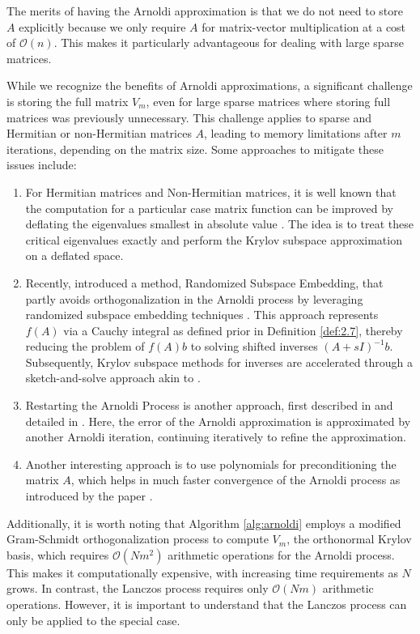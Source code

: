 The merits of having the Arnoldi approximation is that we do not need to store $A$ explicitly because we only require $A$ for matrix-vector multiplication at a cost of $\mathcal{O}(n)$. This makes it particularly advantageous for dealing with large sparse matrices.

While we recognize the benefits of Arnoldi approximations, a significant challenge is storing the full matrix $V_m$, even for large sparse matrices where storing full matrices was previously unnecessary. This challenge applies to sparse and Hermitian or non-Hermitian matrices $A$, leading to memory limitations after $m$ iterations, depending on the matrix size. Some approaches to mitigate these issues include:

\begin{enumerate}
    \item For Hermitian matrices and Non-Hermitian matrices, it is well known that the computation for a particular case matrix function can be improved by deflating the eigenvalues smallest in absolute value \cite{10}. The idea is to treat these critical eigenvalues exactly and perform the Krylov subspace approximation on a deflated space.
    \item Recently, \cite{41} introduced a method, Randomized Subspace Embedding, that partly avoids orthogonalization in the Arnoldi process by leveraging randomized subspace embedding techniques \cite{42}. This approach represents $f(A)$ via a Cauchy integral as defined prior in Definition \ref{def:2.7}, thereby reducing the problem of $f(A)b$ to solving shifted inverses $(A + sI)^{-1}b$. Subsequently, Krylov subspace methods for inverses are accelerated through a sketch-and-solve approach akin to \cite{43}.
    
    \item Restarting the Arnoldi Process is another approach, first described in \cite{44} and detailed in \cite{45}. Here, the error of the Arnoldi approximation is approximated by another Arnoldi iteration, continuing iteratively to refine the approximation.

    \item Another interesting approach is to use polynomials for preconditioning the matrix $A$, which helps in much faster convergence of the Arnoldi process as introduced by the paper \cite{49}.
\end{enumerate}

Additionally, it is worth noting that Algorithm \ref{alg:arnoldi} employs a modified Gram-Schmidt orthogonalization process to compute $V_m$, the orthonormal Krylov basis, which requires $\mathcal{O}(Nm^2)$ arithmetic operations for the Arnoldi process. This makes it computationally expensive, with increasing time requirements as $N$ grows. In contrast, the Lanczos process requires only $\mathcal{O}(Nm)$ arithmetic operations. However, it is important to understand that the Lanczos process can only be applied to the special case.



